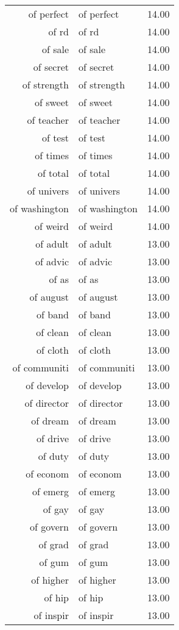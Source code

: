 \begin{table}[ht]
\begin{tabular}{rlr}
  of perfect & of perfect & 14.00 \\ 
  of rd & of rd & 14.00 \\ 
  of sale & of sale & 14.00 \\ 
  of secret & of secret & 14.00 \\ 
  of strength & of strength & 14.00 \\ 
  of sweet & of sweet & 14.00 \\ 
  of teacher & of teacher & 14.00 \\ 
  of test & of test & 14.00 \\ 
  of times & of times & 14.00 \\ 
  of total & of total & 14.00 \\ 
  of univers & of univers & 14.00 \\ 
  of washington & of washington & 14.00 \\ 
  of weird & of weird & 14.00 \\ 
  of adult & of adult & 13.00 \\ 
  of advic & of advic & 13.00 \\ 
  of as & of as & 13.00 \\ 
  of august & of august & 13.00 \\ 
  of band & of band & 13.00 \\ 
  of clean & of clean & 13.00 \\ 
  of cloth & of cloth & 13.00 \\ 
  of communiti & of communiti & 13.00 \\ 
  of develop & of develop & 13.00 \\ 
  of director & of director & 13.00 \\ 
  of dream & of dream & 13.00 \\ 
  of drive & of drive & 13.00 \\ 
  of duty & of duty & 13.00 \\ 
  of econom & of econom & 13.00 \\ 
  of emerg & of emerg & 13.00 \\ 
  of gay & of gay & 13.00 \\ 
  of govern & of govern & 13.00 \\ 
  of grad & of grad & 13.00 \\ 
  of gum & of gum & 13.00 \\ 
  of higher & of higher & 13.00 \\ 
  of hip & of hip & 13.00 \\ 
  of inspir & of inspir & 13.00 \\ 

\end{tabular}
\end{table}
